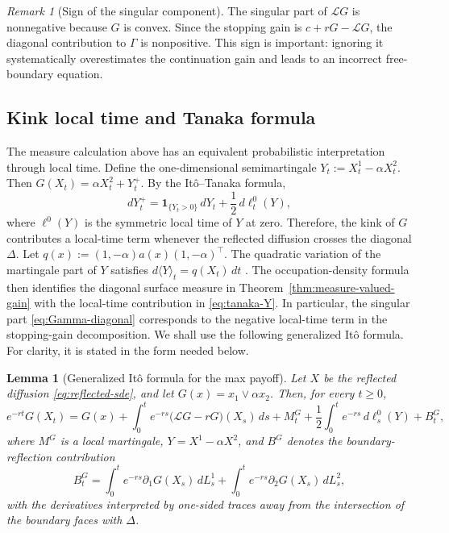 \documentclass[pdflatex,sn-mathphys-num]{sn-jnl}
\theoremstyle{plain}
\newtheorem{lemma}[theorem]{Lemma}
\theoremstyle{definition}
\theoremstyle{remark}
\newtheorem{remark}[theorem]{Remark}
\numberwithin{equation}{section}
\begin{document}
\begin{remark}[Sign of the singular component] \label{rem:sign-singular-component} 
The singular part of \(\mathcal LG\) is nonnegative because \(G\) is convex. Since the stopping gain is \(c+rG-\mathcal LG\), the diagonal contribution to \(\Gamma\) is nonpositive. This sign is important: ignoring it systematically overestimates the continuation gain and leads to an incorrect free-boundary equation. 
\end{remark} 

\subsection{Kink local time and Tanaka formula} \label{subsec:kink-local-time} 
The measure calculation above has an equivalent probabilistic interpretation through local time. Define the one-dimensional semimartingale 
$\displaystyle Y_t:=X_t^1-\alpha X_t^2 $. 
Then 
$\displaystyle G(X_t)=\alpha X_t^2+Y_t^+ $. 
By the It\^{o}--Tanaka formula, 
\begin{equation} \label{eq:tanaka-Y} 
dY_t^+ = \mathbf 1_{\{Y_t>0\}}\,dY_t + \frac12\,d\ell_t^0(Y), \end{equation} 
where \(\ell^0(Y)\) is the symmetric local time of \(Y\) at zero. Therefore, the kink of \(G\) contributes a local-time term whenever the reflected diffusion crosses the diagonal \(\Delta\). Let 
$\displaystyle q(x):=(1,-\alpha)a(x)(1,-\alpha)^\top $. 
The quadratic variation of the martingale part of \(Y\) satisfies 
$\displaystyle d\langle Y\rangle_t=q(X_t)\,dt$ . 
The occupation-density formula then identifies the diagonal surface measure in Theorem~\ref{thm:measure-valued-gain} with the local-time contribution in \eqref{eq:tanaka-Y}. In particular, the singular part \eqref{eq:Gamma-diagonal} corresponds to the negative local-time term in the stopping-gain decomposition. We shall use the following generalized It\^{o} formula. For clarity, it is stated in the form needed below. 

\begin{lemma}[Generalized It\^{o} formula for the max payoff] \label{lem:ito-max-payoff} 
Let \(X\) be the reflected diffusion \eqref{eq:reflected-sde}, and let \(G(x)=x_1\vee \alpha x_2\). Then, for every \(t\ge0\), 
\[
e^{-rt}G(X_t) = G(x) + \int_0^t e^{-rs} \big(\mathcal LG-rG\big)(X_s)\,ds + M_t^G 
+ \frac12\int_0^t e^{-rs}\,d\ell_s^0(Y) + B_t^G , 
\]
where \(M^G\) is a local martingale, \(Y=X^1-\alpha X^2\), and \(B^G\) denotes the boundary-reflection contribution \begin{equation} \label{eq:boundary-contribution-G} 
B_t^G = \int_0^t e^{-rs}\partial_1G(X_s)\,dL_s^1 + \int_0^t e^{-rs}\partial_2G(X_s)\,dL_s^2 , 
\end{equation} 
with the derivatives interpreted by one-sided traces away from the intersection of the boundary faces with \(\Delta\). 
\end{lemma} 
\end{document}
